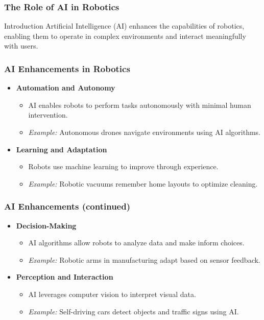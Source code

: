 \documentclass[aspectratio=169]{beamer}
\begin{document}
\begin{frame}[fragile]
    \frametitle{The Role of AI in Robotics}
    \begin{block}{Introduction}
        Artificial Intelligence (AI) enhances the capabilities of robotics, enabling them to operate in complex environments and interact meaningfully with users.
    \end{block}
\end{frame}

\begin{frame}[fragile]
    \frametitle{AI Enhancements in Robotics}
    \begin{itemize}
        \item \textbf{Automation and Autonomy}
            \begin{itemize}
                \item AI enables robots to perform tasks autonomously with minimal human intervention.
                \item \textit{Example:} Autonomous drones navigate environments using AI algorithms.
            \end{itemize}
        
        \item \textbf{Learning and Adaptation}
            \begin{itemize}
                \item Robots use machine learning to improve through experience.
                \item \textit{Example:} Robotic vacuums remember home layouts to optimize cleaning.
            \end{itemize}
    \end{itemize}
\end{frame}

\begin{frame}[fragile]
    \frametitle{AI Enhancements (continued)}
    \begin{itemize}
        \item \textbf{Decision-Making}
            \begin{itemize}
                \item AI algorithms allow robots to analyze data and make inform choices.
                \item \textit{Example:} Robotic arms in manufacturing adapt based on sensor feedback.
            \end{itemize}
        
        \item \textbf{Perception and Interaction}
            \begin{itemize}
                \item AI leverages computer vision to interpret visual data.
                \item \textit{Example:} Self-driving cars detect objects and traffic signs using AI.
            \end{itemize}
    \end{itemize}
\end{frame}
\end{document}
